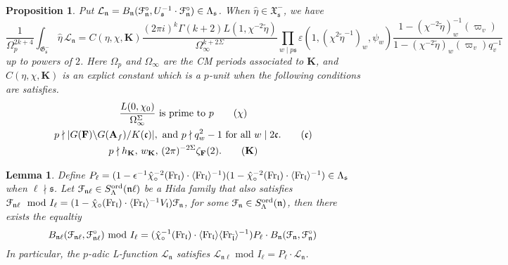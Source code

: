 \documentclass[leqno]{amsart}
\newcommand{\euF}{\EuScript{F}} %
\newcommand{\fG}{\mathfrak{G}}
\newcommand{\fX}{\mathfrak{X}}
\newcommand{\Fr}{\textnormal{Fr}} %
\newcommand{\ord}{\textnormal{ord}}
\newcommand{\A}{\mathbf A}
\newcommand{\F}{{\mathbf{F}}} %
\newcommand{\K}{{\mathbf{K}}} %
\newcommand{\fc}{\mathfrak{c}}
\newcommand{\fs}{\mathfrak{s}}
\newcommand{\fn}{\mathfrak{n}}
\newcommand{\fl}{\mathfrak{l}}
\newtheorem{lem}[thm]{Lemma}
\newtheorem{prop}[thm]{Proposition}
\theoremstyle{definition}
\theoremstyle{remark}
\begin{document}
\begin{prop}\cite[Thm 7.7]{lee}   
Put $\mathcal{L}_\fn=B_\fn
(\euF^\circ_{\fn},U_\fs^{-1}\cdot\euF^\circ_{\fn})
\in \Lambda_{\fs}$. 
When $ \hat{\eta}\in \fX_{\fs}^-$, we have
\begin{equation*}
	\frac{1}{\Omega_p^{2k+4}}
	\int_{\fG_{\fs}^-}\hat{\eta}\,\mathcal{L}_\fn=
	C(\eta,\chi,\K)
	\frac{(2\pi i)^{k}\Gamma(k+2)
	L(1,\chi^{-2}\tilde{\eta})}{\Omega_\infty^{k+2\Sigma}}
	\prod_{w\mid p\fs}
	\varepsilon(1,(\chi^{2}\tilde{\eta}^{-1})_w,\psi_w)
	\frac{1-(\chi^{-2}\tilde{\eta})^{-1}_w(\varpi_v)}
	{1-(\chi^{-2}\tilde{\eta})_w(\varpi_v)q_v^{-1}}
\end{equation*}
up to powers of $2$.
Here $\Omega_p$ and  $\Omega_\infty$
are the CM periods associated to  $\K$,
and $C(\eta,\chi,\K)$ is an explict constant 
which is a $p$-unit when the following
conditions are satisfies.
\begin{gather}
	\frac{L(0,\chi_0)}{\Omega_\infty^{\Sigma}}
	\text{ is prime to }p
	\label{cond:chi}\tag{$\chi$}\\
	p\nmid |G(\F)\backslash G(\A_f)/K(\fc)|,
	\text{ and }p\nmid q_w^2-1\text{ for all }w\mid 2\fc.
	\label{cond:fc}\tag{$\fc$}\\
	p\nmid h_\K, \, w_\K, \, (2\pi)^{-2\Sigma}\zeta_\F(2).
	\label{cond:K}\tag{$\K$}
\end{gather}
\end{prop}

\begin{lem}\label{lem:compare_L_diff_level}
Define 
$P_\ell=(1-\epsilon^{-1}\hat{\chi}_\circ^{-2}(\Fr_\fl)\cdot 
\langle \Fr_\fl\rangle^{-1})
(1-\hat{\chi}_\circ^{-2}(\Fr_\fl)\cdot 
\langle \Fr_\fl\rangle^{-1})\in \Lambda_{\fs}$
when $\ell\nmid \fs$.
Let $\euF_{\fn\ell}\in S_\Lambda^{\ord}(\fn\ell)$
be a Hida family that also satisfies
$\euF_{\fn\ell} \mod I_{\ell}=
(1-\hat{\chi}_\circ(\Fr_\fl)\cdot 
\langle \Fr_\fl\rangle^{-1} V_\fl)
\euF_{\fn}$,
for some $\euF_{\fn}\in S_\Lambda^{\ord}(\fn)$, then 
there exists the equaltiy
\[
	B_{\fn\ell}(\euF_{\fn\ell}, \euF^{\circ}_{\fn\ell})
	\text{ mod }I_\ell=
	(\hat{\chi}_\circ^{-1}(\Fr_\fl)\cdot 
	\langle \Fr_\fl\rangle
	\langle \Fr_{\bar{\fl}}\rangle^{-1})
	P_\ell\cdot B_{\fn}(\euF_{\fn}, \euF^{\circ}_{\fn})
\]
In particular, 
the $p$-adic L-function $\mathcal{L}_\fn$ satisfies 
$\mathcal{L}_{\fn\ell} \text{ mod }I_\ell=
P_\ell\cdot \mathcal{L}_\fn$.
\end{lem}
\end{document}
